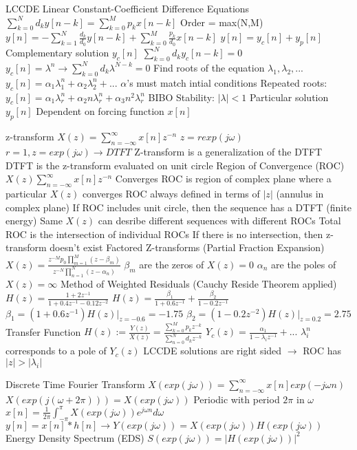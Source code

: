 \documentclass[14pt]{extarticle}
\begin{document}
\begin{outline}
		\1	LCCDE
			\2	Linear Constant-Coefficient Difference Equations
			\2	$\sum_{k=0}^Nd_ky[n-k] = \sum_{k=0}^Mp_kx[n-k]$
			\2	Order = max(N,M)
			\2	$y[n] = -\sum_{k=1}^N\frac{d_k}{d_0}y[n-k] + \sum_{k=0}^M\frac{p_k}{d_0}x[n-k]$
			\2	$y[n] = y_c[n] + y_p[n]$
				\3	Complementary solution $y_c[n]$
					\4	$\sum_{k=0}^N d_ky_c[n-k] = 0$
					\4	$y_c[n] = \lambda^n \rightarrow \sum_{k=0}^Nd_k\lambda^{N-k} = 0$
					\4	Find roots of the equation $\lambda_1,\lambda_2,...$
					\4	$y_c[n] = \alpha_1\lambda_1^n + \alpha_2\lambda_2^n + ...	$
					\4	$\alpha$'s must match intial conditions
					\4	Repeated roots: $y_c[n] = \alpha_1\lambda_r^n + \alpha_2n\lambda_r^n + \alpha_3n^2\lambda_r^n$
					\4	BIBO Stability: $|\lambda| < 1$
				\3	Particular solution $y_p[n]$
					\4	Dependent on forcing function $x[n]$

		\1	z-transform
			\2	$X(z) = \sum_{n=-\infty}^{\infty}x[n]z^{-n}$
				\3	$z = r exp(j\omega)$
				\3	$r = 1, z = exp(j\omega) \rightarrow DTFT$
				\3	Z-transform is a generalization of the DTFT
				\3	DTFT is the z-transform evaluated on unit circle
			\2	Region of Convergence (ROC)
				\3	$X(z) \sum_{n=-\infty}^{\infty} x[n]z^{-n}$ Converges
				\3	ROC is region of complex plane where a particular $X(z)$ converges
				\3	ROC always defined in terms of $|z|$ (annulus in complex plane)
				\3	If ROC includes unit circle, then the sequence has a DTFT (finite energy)
				\3	Same $X(z)$ can desribe different sequences with different ROCs
				\3	Total ROC is the intersection of individual ROCs
					\4	If there is no intersection, then z-transform doesn't exist
			\2	Factored Z-transforms (Partial Fraction Expansion)
				\3	$X(z) = \frac{z^{-M}p_0 \prod_{m=1}^M (z - \beta_m)}{z^{-N}\prod_{n=1}^N(z - \alpha_n)}$
				\3	$\beta_m$ are the zeros of $X(z) = 0$
				\3	$\alpha_n$ are the poles of $X(z) = \infty$
				\3	Method of Weighted Residuals (Cauchy Reside Theorem applied)
					\4	$H(z) = \frac{1 + 2z^{-1}}{1 + 0.4z^{-1} - 0.12z^{-2}}$
					\4	$H(z) = \frac{\beta_1}{1 + 0.6z^{-1}} + \frac{\beta_2}{1 - 0.2z^{-1}}$
					\4	$\beta_1 = (1 + 0.6z^{-1})H(z)|_{z = -0.6} = -1.75$
					\4	$\beta_2 = (1 - 0.2z^{-2})H(z)|_{z = 0.2} = 2.75$
			\2	Transfer Function
				\3	$H(z) := \frac{Y(z)}{X(z)} = \frac{\sum_{k=0}^M p_k z^{-k}}{\sum_{n=0}^N d_k z^{-k}}$
				\3	$Y_c(z) = \frac{\alpha_1}{1 - \lambda_iz^{-1}} + ...$
					\4	$\lambda_i^n$ corresponds to a pole of $Y_c(z)$
					\4	LCCDE solutions are right sided $\rightarrow$ ROC has $|z| > |\lambda_i|$
		
		\1	Discrete Time Fourier Transform
			\2	$X(exp(j\omega)) = \sum_{n=-\infty}^{\infty} x[n] exp(-j\omega n)$
			\2	$X(exp(j(\omega + 2\pi))) = X(exp(j\omega))$ Periodic with period $2\pi$ in $\omega$
			\2	$x[n] = \frac{1}{2\pi}\int_{-\pi}^{\pi}X(exp(j\omega))e^{j\omega n}d\omega$
			\2	$y[n] = x[n] * h[n] \rightarrow Y(exp(j\omega)) = X(exp(j\omega))H(exp(j\omega))$
			\2	Energy Density Spectrum (EDS)
				\3	$S(exp(j\omega)) = |H(exp(j\omega))|^2$


\end{outline}
\end{document}
